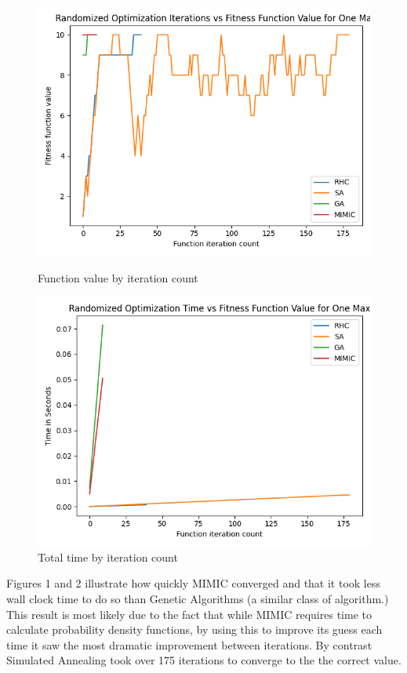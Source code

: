 \documentclass[11pt]{article}
\begin{document}
    \begin{figure}
        \begin{minipage}{0.5\textwidth}
            \centering
            \includegraphics[width=.9\linewidth]{onemax1.png}
            \caption{Function value by iteration count}\label{Fig:Data1}
        \end{minipage}\hfill
        \begin{minipage}{0.5\textwidth}
            \centering
            \includegraphics[width=.9\linewidth]{onemax2.png}
            \caption{Total time by iteration count}\label{Fig:Data2}
        \end{minipage}
    \end{figure}

    Figures 1 and 2 illustrate how quickly MIMIC converged and that it took less wall clock time to do so than Genetic Algorithms
    (a similar class of algorithm.)
    This result is most likely due to the fact that while MIMIC requires time to calculate probability density functions,
    by using this to improve its guess each time it saw the most dramatic improvement between iterations.
    By contrast Simulated Annealing took over 175 iterations to converge to the the correct value.
\end{document}

